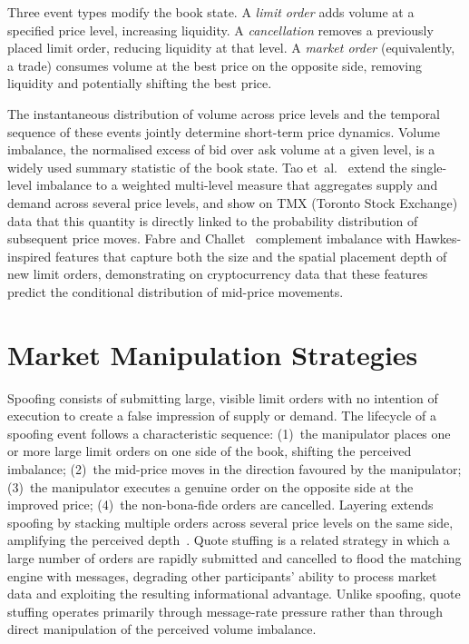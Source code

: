 \documentclass[11pt]{report}
\begin{document}
Three event types modify the book state. A \emph{limit order} adds volume at a specified price level, increasing liquidity. A \emph{cancellation} removes a previously placed limit order, reducing liquidity at that level. A \emph{market order} (equivalently, a trade) consumes volume at the best price on the opposite side, removing liquidity and potentially shifting the best price.

The instantaneous distribution of volume across price levels and the temporal sequence of these events jointly determine short-term price dynamics. Volume imbalance, the normalised excess of bid over ask volume at a given level, is a widely used summary statistic of the book state. Tao et~al.~\cite{tao_2020} extend the single-level imbalance to a weighted multi-level measure that aggregates supply and demand across several price levels, and show on TMX (Toronto Stock Exchange) data that this quantity is directly linked to the probability distribution of subsequent price moves. Fabre and Challet~\cite{fabre_2025} complement imbalance with Hawkes-inspired features that capture both the size and the spatial placement depth of new limit orders, demonstrating on cryptocurrency data that these features predict the conditional distribution of mid-price movements.

\section{Market Manipulation Strategies}\label{sec:background:manipulation}

Spoofing consists of submitting large, visible limit orders with no intention of execution to create a false impression of supply or demand. The lifecycle of a spoofing event follows a characteristic sequence:
(1)~the manipulator places one or more large limit orders on one side of the book, shifting the perceived imbalance;
(2)~the mid-price moves in the direction favoured by the manipulator;
(3)~the manipulator executes a genuine order on the opposite side at the improved price;
(4)~the non-bona-fide orders are cancelled.
Layering extends spoofing by stacking multiple orders across several price levels on the same side, amplifying the perceived depth~\cite{fabre_2025}. Quote stuffing is a related strategy in which a large number of orders are rapidly submitted and cancelled to flood the matching engine with messages, degrading other participants' ability to process market data and exploiting the resulting informational advantage. Unlike spoofing, quote stuffing operates primarily through message-rate pressure rather than through direct manipulation of the perceived volume imbalance.
\end{document}
